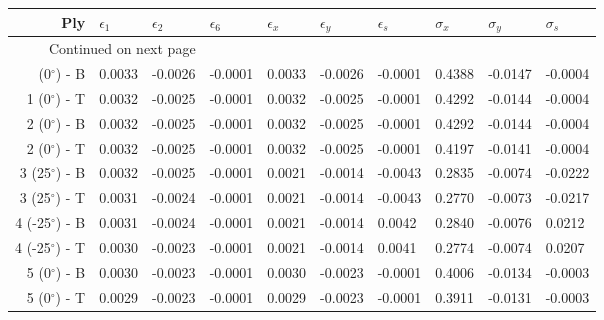 \begin{table}[H]
\caption{Blah}
\label{blah}
\begin{longtable}{rlllllllll}
\toprule
                   Ply &  $\epsilon_1$ &  $\epsilon_2$ &  $\epsilon_6$ &  $\epsilon_x$ &  $\epsilon_y$ &  $\epsilon_s$ &  $\sigma_x$ &  $\sigma_y$ &  $\sigma_s$ \\
\midrule
\endhead
\midrule
\multicolumn{3}{r}{{Continued on next page}} \\
\midrule
\endfoot

\bottomrule
\endlastfoot
   1 (0$^\circ$) - B &        0.0033 &       -0.0026 &       -0.0001 &        0.0033 &       -0.0026 &       -0.0001 &      0.4388 &     -0.0147 &     -0.0004 \\
   1 (0$^\circ$) - T &        0.0032 &       -0.0025 &       -0.0001 &        0.0032 &       -0.0025 &       -0.0001 &      0.4292 &     -0.0144 &     -0.0004 \\\midrule
   2 (0$^\circ$) - B &        0.0032 &       -0.0025 &       -0.0001 &        0.0032 &       -0.0025 &       -0.0001 &      0.4292 &     -0.0144 &     -0.0004 \\
   2 (0$^\circ$) - T &        0.0032 &       -0.0025 &       -0.0001 &        0.0032 &       -0.0025 &       -0.0001 &      0.4197 &     -0.0141 &     -0.0004 \\\midrule
  3 (25$^\circ$) - B &        0.0032 &       -0.0025 &       -0.0001 &        0.0021 &       -0.0014 &       -0.0043 &      0.2835 &     -0.0074 &     -0.0222 \\
  3 (25$^\circ$) - T &        0.0031 &       -0.0024 &       -0.0001 &        0.0021 &       -0.0014 &       -0.0043 &      0.2770 &     -0.0073 &     -0.0217 \\\midrule
 4 (-25$^\circ$) - B &        0.0031 &       -0.0024 &       -0.0001 &        0.0021 &       -0.0014 &        0.0042 &      0.2840 &     -0.0076 &      0.0212 \\
 4 (-25$^\circ$) - T &        0.0030 &       -0.0023 &       -0.0001 &        0.0021 &       -0.0014 &        0.0041 &      0.2774 &     -0.0074 &      0.0207 \\\midrule
   5 (0$^\circ$) - B &        0.0030 &       -0.0023 &       -0.0001 &        0.0030 &       -0.0023 &       -0.0001 &      0.4006 &     -0.0134 &     -0.0003 \\
   5 (0$^\circ$) - T &        0.0029 &       -0.0023 &       -0.0001 &        0.0029 &       -0.0023 &       -0.0001 &      0.3911 &     -0.0131 &     -0.0003 \\\midrule

\end{longtable}
\end{table}
